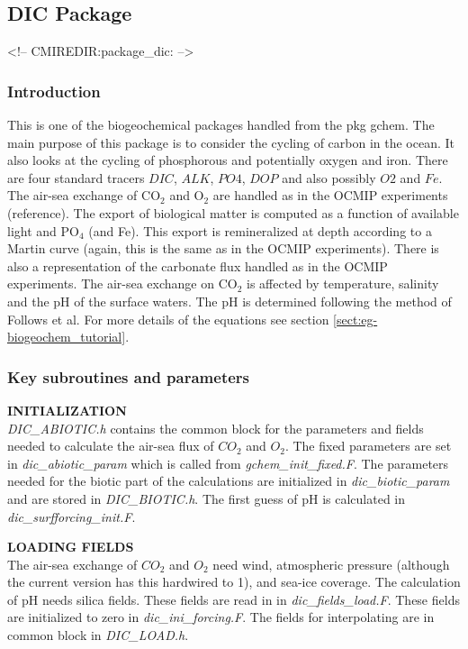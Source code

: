 \subsection {DIC Package} 
\label{sec:pkg:dic}
\begin{rawhtml}
<!-- CMIREDIR:package_dic: -->
\end{rawhtml}

\subsubsection {Introduction}
This is one of the biogeochemical packages handled from the
pkg gchem. The main purpose of this package is to consider
the cycling of carbon in the ocean. It also looks at the
cycling of phosphorous and potentially oxygen and iron. 
There are four standard tracers
$DIC$, $ALK$, $PO4$, $DOP$ and also possibly $O2$ and $Fe$. 
The air-sea exchange
of CO$_2$ and O$_2$ are handled as in the OCMIP experiments
(reference). The export of biological matter is computed
as a function of available light and PO$_4$ (and Fe). This export is
remineralized at depth according to a Martin curve (again,
this is the same as in the OCMIP experiments). There is
also a representation of the carbonate flux handled as in
the OCMIP experiments. The air-sea exchange on CO$_2$
is affected by temperature, salinity and the pH of the
surface waters. The pH is determined following the
method of Follows et al. 
For more details of the equations see section 
\ref{sect:eg-biogeochem_tutorial}.

\subsubsection {Key subroutines and parameters}

\noindent
{{\bf INITIALIZATION}} \\
{\it DIC\_ABIOTIC.h} contains the common block for the 
parameters and fields needed to calculate the air-sea
flux of $CO_2$ and $O_2$. The fixed parameters are set in
{\it dic\_abiotic\_param} which is called from {\it gchem\_init\_fixed.F}.
The parameters needed for the biotic part of the calculations
are initialized in {\it dic\_biotic\_param} and are stored
in {\it DIC\_BIOTIC.h}. The first guess of pH is calculated
in {\it dic\_surfforcing\_init.F}.

\vspace{.5cm}

\noindent
{{\bf LOADING FIELDS}}\\
The air-sea exchange of $CO_2$ and $O_2$ need wind, atmospheric
pressure (although the current version has this hardwired to 1),
and sea-ice coverage. The calculation of pH needs silica fields.
These fields are read in in {\it dic\_fields\_load.F}. These
fields are initialized to zero in {\it dic\_ini\_forcing.F}.
The fields for interpolating are in common block in 
{\it DIC\_LOAD.h}.

